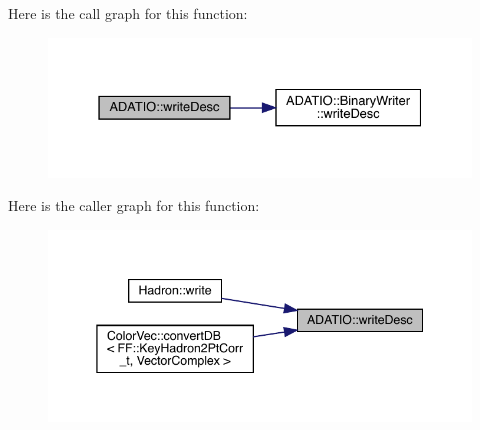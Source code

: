 Here is the call graph for this function\+:
\nopagebreak
\begin{figure}[H]
\begin{center}
\leavevmode
\includegraphics[width=331pt]{d0/dba/namespaceADATIO_a0faeed900aacb29febaa709323135c50_cgraph}
\end{center}
\end{figure}
Here is the caller graph for this function\+:
\nopagebreak
\begin{figure}[H]
\begin{center}
\leavevmode
\includegraphics[width=345pt]{d0/dba/namespaceADATIO_a0faeed900aacb29febaa709323135c50_icgraph}
\end{center}
\end{figure}
